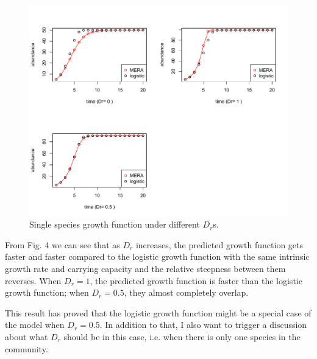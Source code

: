\documentclass[12pt]{article}
\begin{document}
\begin{figure}
\caption{Single species growth function under different $D_r$s.}
\includegraphics[width=\textwidth]{single_species_Dreffect.pdf}
\end{figure}


From Fig. 4 we can see that as $D_r$ increases, the predicted growth function gets faster and faster compared to the logistic growth function with the same intrinsic growth rate and carrying capacity and the relative steepness between them reverses. When $D_r=1$, the predicted growth function is faster than the logistic growth function; when $D_r=0.5$, they almost completely overlap.

This result has proved that the logistic growth function might be a special case of the model when $D_r=0.5$. In addition to that, I also want to trigger a discussion about what $D_r$ should be in this case, i.e. when there is only one species in the community. 
\end{document}

